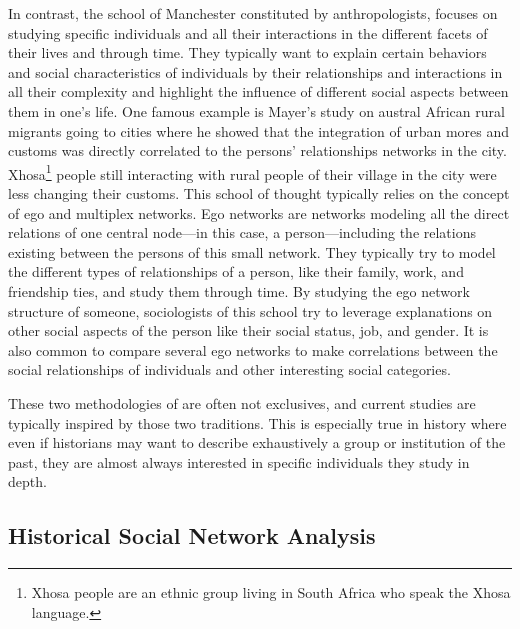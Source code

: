 In contrast, the school of Manchester constituted by anthropologists, focuses on studying specific individuals and all their interactions in the different facets of their lives and through time.
They typically want to explain certain behaviors and social characteristics of individuals by their relationships and interactions in all their complexity and highlight the influence of different social aspects between them in one's life.
One famous example is Mayer's study on austral African rural migrants going to cities\cite{mayerMigrancyStudyAfricans1962} where he showed that the integration of urban mores and customs was directly correlated to the persons' relationships networks in the city.
Xhosa\footnote{Xhosa people are an ethnic group living in South Africa who speak the Xhosa language.} people still interacting with rural people of their village in the city were less changing their customs.
This school of thought typically relies on the concept of ego and multiplex networks\cite{eveDeuxTraditionsAnalyse2002}.
Ego networks are networks modeling all the direct relations of one central node---in this case, a person---including the relations existing between the persons of this small network.
They typically try to model the different types of relationships of a person, like their family, work, and friendship ties, and study them through time.
By studying the ego network structure of someone, sociologists of this school try to leverage explanations on other social aspects of the person like their social status, job, and gender.
It is also common to compare several ego networks to make correlations between the social relationships of individuals and other interesting social categories\cite{charbeyStarsHolesPaths2019}.

These two methodologies of \sna are often not exclusives, and current studies are typically inspired by those two traditions.
This is especially true in history where even if historians may want to describe exhaustively a group or institution of the past, they are almost always interested in specific individuals they study in depth.


\subsection{Historical Social Network Analysis}\label{subsec:historical-social-network-analsyis}


